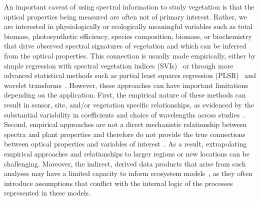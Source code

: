 An important caveat of using spectral information to study vegetation is that the optical properties being measured are often not of primary interest.
Rather, we are interested in physiologically or ecologically meaningful variables such as total biomass, photosynthetic efficiency, species composition, biomass, or biochemistry that drive observed spectral signatures of vegetation and which can be inferred from the optical properties.
This connection is usually made empirically, either by simple regression with spectral vegetation indices (SVIs)~\cite{fassnacht_2015_nondestructive,haboudane_2002_integrated,huete_2002_overview}
or through more advanced statistical methods such as partial least squares regression (PLSR)~\cite{couture_2013_spectroscopic,serbin_2012_spectroscopic,serbin_spectroscopic_2014,singh_imaging_2015} and wavelet transforms~\cite{banskota_2013_utlity,blackburn_2008_retrieval,cheng_2010_continuous}.
However, these approaches can have important limitations depending on the application. 
First, the empirical nature of these methods can result in sensor, site, and/or vegetation specific relationships, as evidenced by the substantial variability in coefficients and choice of wavelengths across studies~\cite{croft_2014_applicability,huete_2002_overview,knyazikhin_1998_estimation,leprieur_1994_evaluation,liu_2012_assessment,myneni_2002_global,wessels_2012_limits}.
Second, empirical approaches are not a direct mechanistic relationship between spectra and plant properties and therefore do not provide the true connections between optical properties and variables of interest~\cite{knyazikhin_2012_hyperspectral}.
As a result, extrapolating empirical approaches and relationships to larger regions or new locations can be challenging.
Moreover, the indirect, derived data products that arise from such analyses may have a limited capacity to inform ecosystem models~\cite{quaife_2008_assimilating}, as they often introduce assumptions that conflict with the internal logic of the processes represented in these models. 

